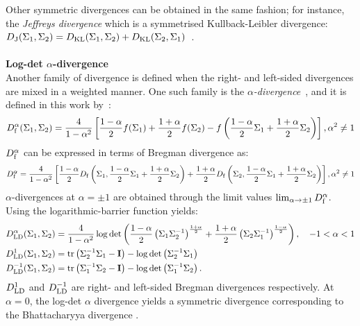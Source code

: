 Other symmetric divergences can be obtained in the same fashion; for instance, the \emph{Jeffreys divergence} which is a symmetrised Kullback-Leibler divergence: $D_{\operatorname{J}}(\Sigma_1, \Sigma_2) = D_{\operatorname{KL}}(\Sigma_1, \Sigma_2) + D_{\operatorname{KL}}(\Sigma_2, \Sigma_1)$~\cite{sra_positive_2016}.
\\ \\ \textbf{Log-det $\alpha$-divergence} \\
Another family of divergence is defined when the right- and left-sided divergences are mixed in a weighted manner.
One such family is the \emph{$\alpha$-divergence}~\cite{nielsen_clustering_2014}, and it is defined in this work by~\cite{chebbi_means_2012}:
\begin{equation}
\divB{f}^\alpha(\P_1,\P_2) = \frac{4}{1-\alpha^2}\left[ \frac{1-\alpha}{2} f(\P_1) + \frac{1+\alpha}{2}f(\P_2) - f \left( \frac{1-\alpha}{2}\P_1 + \frac{1+\alpha}{2}\P_2 \right) \right], \alpha^2 \neq 1
\label{eq:div-alpha}
\end{equation}
$D_{\operatorname{f}}^\alpha$ can be expressed in terms of Bregman divergence as:
\begin{equation}
\divB{f}^\alpha = \frac{4}{1-\alpha^2}\left[\frac{1-\alpha}{2}\divB{f}\left(\P_1, \frac{1-\alpha}{2}\P_1+\frac{1+\alpha}{2}\P_2\right) + \frac{1+\alpha}{2}\divB{f}\left(\P_2, \frac{1-\alpha}{2}\P_1 + \frac{1+\alpha}{2} \P_2 \right)\right], \alpha^2 \neq 1
\label{eq:div-alpha2}
\end{equation}
$\alpha$-divergences at $\alpha = \pm 1$ are obtained through the limit values $\lim_{\alpha \rightarrow \pm 1}D_{\operatorname{f}}^\alpha$. 
Using the logarithmic-barrier function yields:
\begin{equation}
\begin{split}
\divB{LD}^\alpha(\P_1,\P_2) &= \frac{4}{1-\alpha^2}\log \det \left(\frac{1-\alpha}{2}\left(\P_1 \P_2^{-1}\right)^{\frac{1+\alpha}{2}}+\frac{1+\alpha}{2}\left(\P_2 \P_1^{-1}\right)^{\frac{1-\alpha}{2}}\right), \quad -1 < \alpha < 1 \\
\divB{LD}^{1}(\P_1,\P_2) &= \tr \left( \P_2^{-1}\P_1-\eye \right) - \log \det \left(\P_2^{-1}\P_1 \right)\\
\divB{LD}^{-1}(\P_1,\P_2) &= \tr \left(\P_1^{-1}\P_2-\eye \right) - \log \det \left(\P_1^{-1}\P_2 \right) .
\end{split}
\label{eq:div-log-det-alpha}
\end{equation}   
$D_{\operatorname{LD}}^{1}$ and $D_{\operatorname{LD}}^{-1}$ are right- and left-sided Bregman divergences respectively.
At $\alpha=0$, the log-det $\alpha$ divergence yields a symmetric divergence corresponding to the Bhattacharyya divergence \cite{chebbi_means_2012,sra_positive_2016}. 

